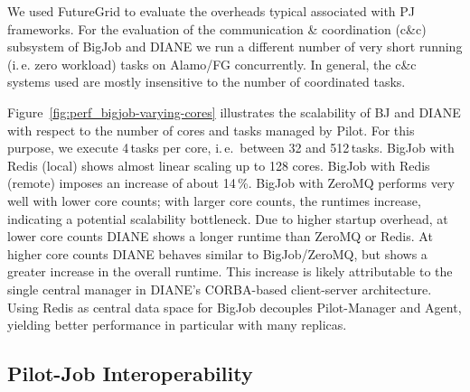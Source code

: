 \documentclass[]{paper}
\begin{document}
We used FutureGrid to evaluate the overheads typical associated with PJ
frameworks. For the evaluation of the communication \& coordination (c\&c)
subsystem of BigJob and DIANE we run a different number of very short running
(i.\,e. zero workload) tasks on Alamo/FG concurrently. In general, the c\&c
systems used are mostly insensitive to the number of coordinated tasks.

Figure~\ref{fig:perf_bigjob-varying-cores} illustrates the scalability of BJ
and DIANE with respect to the number of cores and tasks managed by Pilot. For
this purpose, we execute 4\,tasks per core, i.\,e.\ between 32 and 512\,tasks.
BigJob with Redis (local) shows almost linear scaling up to 128 cores. BigJob
with Redis (remote) imposes an increase of about 14\,\%. BigJob with ZeroMQ
performs very well with lower core counts; with larger core counts, the
runtimes increase, indicating a potential scalability bottleneck. Due to
higher startup overhead, at lower core counts DIANE shows a longer runtime
than ZeroMQ or Redis. At higher core counts DIANE behaves similar to
BigJob/ZeroMQ, but shows a greater increase in the overall runtime. This
increase is likely attributable to the single central manager in DIANE's
CORBA-based client-server architecture. Using Redis as central data space for
BigJob decouples Pilot-Manager and Agent, yielding better performance in
particular with many replicas.

\subsection{Pilot-Job Interoperability}
\end{document}
